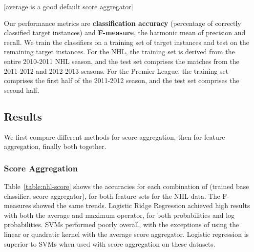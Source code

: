 \documentclass[conference]{IEEEtran}
\begin{document}
[average is a good default score aggregator]


%



Our performance metrics are \textbf{classification accuracy} (percentage of correctly classified target instances) and \textbf{F-measure}, the harmonic mean of precision and recall. We train the classifiers on a training set of target instances and test on the remaining target instances. For the NHL, the training set is derived from the entire 2010-2011 NHL season, and the test set comprises the matches from the 2011-2012 and 2012-2013 seasons. For the Premier League, the training set comprises the first half of the 2011-2012 season, and the test set comprises the second half.



\subsection{Results}
We first compare different methods for score aggregation, then for feature aggregation, finally both together.

\subsubsection{Score Aggregation} Table~\ref{table:nhl-score} shows the accuracies for each combination of (trained base classifier, score aggregator), for both feature sets for the NHL data. The F-measures showed the same trends. Logistic Ridge Regression achieved high results with both the average and maximum operator, for both probabilities and log probabilities. SVMs performed poorly overall, with the exceptions of using the linear or quadratic kernel with the average score aggregator. Logistic regression is superior to SVMs when used with score aggregation on these datasets.
\end{document}
